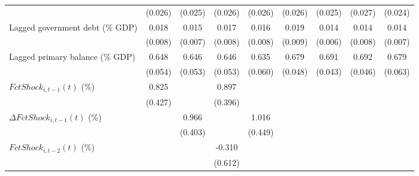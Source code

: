{\begin{tabular}{l*{8}{c}}
                    &     (0.026)         &     (0.025)         &     (0.026)         &     (0.026)         &     (0.026)         &     (0.025)         &     (0.027)         &     (0.024)         \\
\addlinespace
Lagged government debt (\% GDP)&       0.018\sym{**} &       0.015\sym{*}  &       0.017\sym{*}  &       0.016\sym{*}  &       0.019\sym{**} &       0.014\sym{**} &       0.014\sym{*}  &       0.014\sym{*}  \\
                    &     (0.008)         &     (0.007)         &     (0.008)         &     (0.008)         &     (0.009)         &     (0.006)         &     (0.008)         &     (0.007)         \\
\addlinespace
Lagged primary balance (\% GDP)&       0.648\sym{***}&       0.646\sym{***}&       0.646\sym{***}&       0.635\sym{***}&       0.679\sym{***}&       0.691\sym{***}&       0.692\sym{***}&       0.679\sym{***}\\
                    &     (0.054)         &     (0.053)         &     (0.053)         &     (0.060)         &     (0.048)         &     (0.043)         &     (0.046)         &     (0.063)         \\
\addlinespace
$ FctShock_{i,t-1}(t)$ (\%)&       0.825\sym{*}  &                     &       0.897\sym{**} &                     &                     &                     &                     &                     \\
                    &     (0.427)         &                     &     (0.396)         &                     &                     &                     &                     &                     \\
\addlinespace
$ \Delta FctShock_{i,t-1}(t)$ (\%)&                     &       0.966\sym{**} &                     &       1.016\sym{**} &                     &                     &                     &                     \\
                    &                     &     (0.403)         &                     &     (0.449)         &                     &                     &                     &                     \\
\addlinespace
$ FctShock_{i,t-2}(t)$ (\%)&                     &                     &      -0.310         &                     &                     &                     &                     &                     \\
                    &                     &                     &     (0.612)         &                     &                     &                     &                     &                     \\

\end{tabular}}
